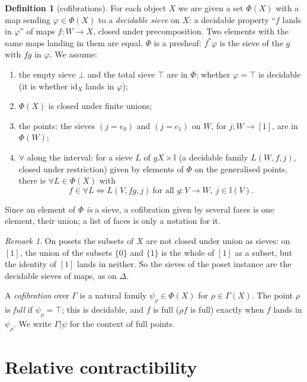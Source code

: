 \documentclass[11pt]{article}
\newcommand{\I}{\mathbb{I}}
\newcommand{\id}{\mathrm{id}}
\theoremstyle{plain}
\theoremstyle{definition}
\newtheorem{definition}[theorem]{Definition}
\theoremstyle{remark}
\newtheorem{remark}[theorem]{Remark}
\begin{document}
\begin{definition}[cofibrations]
For each object $X$ we are given a set $\Phi(X)$ with a map sending
$\varphi\in\Phi(X)$ to a \emph{decidable sieve} on $X$: a decidable
property ``$f$ lands in $\varphi$'' of maps $f:W\to X$, closed under
precomposition. Two elements with the same maps landing in them are
equal. $\Phi$ is a presheaf: $f^*\varphi$ is the sieve of the $g$ with
$fg$ in $\varphi$. We assume:
\begin{enumerate}
\item the empty sieve $\bot$ and the total sieve $\top$ are in $\Phi$;
  whether $\varphi=\top$ is decidable (it is whether $\id_X$ lands in
  $\varphi$);
\item $\Phi(X)$ is closed under finite unions;
\item the points: the sieves $(j=e_0)$ and $(j=e_1)$ on $W$, for
  $j:W\to[1]$, are in $\Phi(W)$;
\item $\forall$ along the interval: for a sieve $L$ of $yX\times\I$
  (a decidable family $L(W,f,j)$, closed under restriction) given by
  elements of $\Phi$ on the generalised points, there is
  $\forall L\in\Phi(X)$ with
  \[
  f\in\forall L\iff L(V,fg,j)\ \text{for all }g:V\to W,\ j\in\I(V).
  \]
\end{enumerate}
\end{definition}

Since an element of $\Phi$ \emph{is} a sieve, a cofibration given by
several faces is one element, their union; a list of faces is only a
notation for it.

\begin{remark}
On posets the subsets of $X$ are not closed under union as sieves: on
$[1]$, the union of the subsets $\{0\}$ and $\{1\}$ is the whole of
$[1]$ as a subset, but the identity of $[1]$ lands in neither. So the
sieves of the poset instance are the decidable sieves of maps, as on
$\Delta$.
\end{remark}

A \emph{cofibration} over $\Gamma$ is a natural family
$\psi_\rho\in\Phi(X)$ for $\rho\in\Gamma(X)$. The point $\rho$ is
\emph{full} if $\psi_\rho=\top$; this is decidable, and $f$ is full
($\rho f$ is full) exactly when $f$ lands in $\psi_\rho$. We write
$\Gamma|\psi$ for the context of full points.

\section{Relative contractibility}\label{sec:rc}
\end{document}
